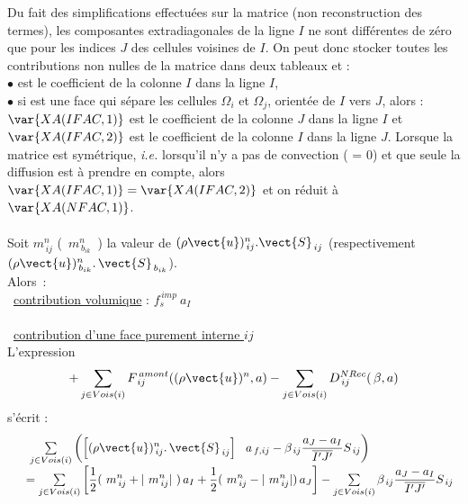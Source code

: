 Du fait des simplifications effectu\'ees sur la matrice (non reconstruction des
termes), les composantes extradiagonales de la ligne $I$ ne sont diff\'erentes de z\'ero que pour
les indices $J$ des cellules voisines de $I$. On peut donc stocker toutes les
contributions non nulles de la matrice dans deux tableaux  et  :\\
$\bullet$  est le coefficient de la colonne $I$ dans la ligne $I$,\\
$\bullet$ si  est une face qui s\'epare les cellules $\Omega_i$
et $\Omega_j$, orient\'ee de $I$ vers $J$, alors :\\
$\var{XA(IFAC,1)}$ est le coefficient de la colonne $J$ dans la ligne $I$ et
$\var{XA(IFAC,2)}$ est le coefficient de la colonne $I$ dans la ligne $J$.
Lorsque la matrice est sym\'etrique, {\it
i.e.} lorsqu'il n'y a pas de convection ( = 0) et que seule la
diffusion est \`a prendre en compte, alors $\var{XA(IFAC,1)} = \var{XA(IFAC,2)}
$ et on r\'eduit  \`a $\var{XA(NFAC,1)}$.\\\\
Soit $m_{\,ij}^n$ (\ $m_{\,{b}_{ik}}^n$\ ) la valeur de $(\rho
\vect{u})_{\,ij}^n.\vect{S}_{\,ij}$ (respectivement $(\rho
\vect{u})_{\,{b}_{ik}}^n\text{.}\,\vect{S}_{\,{b}_{ik}}$).\\
Alors~:\\
\hspace*{1cm}{\tiny$\blacksquare$}\ \underline{contribution volumique} : $ f_s^{\,imp}\ a_I $\\\\
\hspace*{1cm}{\tiny$\blacksquare$}\ \underline{contribution d'une face purement interne $ij$} \\
L'expression \\
\begin{equation}\notag
+ \sum\limits_{j\in Vois(i)}{F^{\,amont}_{\,ij}((\rho \vect{u})^n, a)}
- \sum\limits_{j\in Vois(i)}{D^{NRec}_{\,ij}(\,\beta, a)}
\end{equation}
 s'\'ecrit :
\begin{equation}\label{Base_Matrix_eq_face_int}
\begin{array}{ll}
&\ \sum\limits_{j\in Vois(i)}\displaystyle\left({ \left[{(\rho \vect{u})_{\,ij}^n} \text{.}\,
\vect{S}_{\,ij}\right]\ \ a_{\,f,ij} - \beta_{\,ij}\frac{a_J - a_I}{\overline{I'J'}} S_{\,ij}}\right)\\
&=\sum\limits_{j\in Vois(i)}\left[\displaystyle\frac{1}{2}(\  m_{\,ij}^n + |\
m_{\,ij}^n|\ )\,a_I + \displaystyle\frac{1}{2}(\ m_{\,ij}^n - |\
m_{\,ij}^n|)\,a_J\right] - \sum\limits_{j\in Vois(i)}\displaystyle \beta_{\,ij}\frac{a_J - a_I}{\overline{I'J'}} S_{\,ij}
\end{array}
\end{equation}\\
